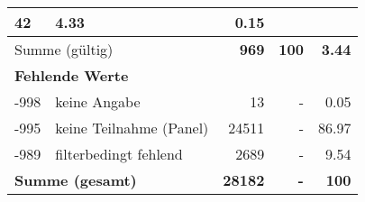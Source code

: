 \begin{longtable}{lXrrr}
       \num{42} &
       \num[round-mode=places,round-precision=2]{4,33} &
         \num[round-mode=places,round-precision=2]{0,15} \\
     \midrule
     \multicolumn{2}{l}{Summe (gültig)} &
       \textbf{\num{969}} &
     \textbf{100} &
       \textbf{\num[round-mode=places,round-precision=2]{3,44}} \\
     \multicolumn{5}{l}{\textbf{Fehlende Werte}}\\
       -998 &
       keine Angabe &
         \num{13} &
        - &
         \num[round-mode=places,round-precision=2]{0,05} \\
       -995 &
       keine Teilnahme (Panel) &
         \num{24511} &
        - &
         \num[round-mode=places,round-precision=2]{86,97} \\
       -989 &
       filterbedingt fehlend &
         \num{2689} &
        - &
         \num[round-mode=places,round-precision=2]{9,54} \\
     \midrule
     \multicolumn{2}{l}{\textbf{Summe (gesamt)}} &
          \textbf{\num{28182}} &
        \textbf{-} &
        \textbf{100} \\
     \bottomrule
     \end{longtable}
     
